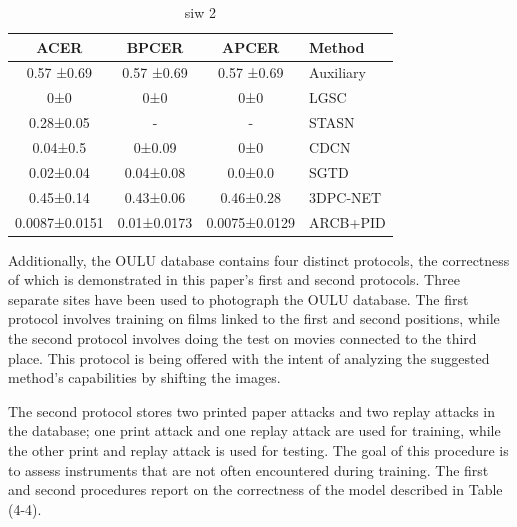 \documentclass[journal]{IEEEtran}
\begin{document}
\begin{table}[!h]
	\caption{siw 2 }
	\label{tab:siw2}
	\centering
	\begin{tabular}{|c|c|c|l|}
	\hline ACER      & BPCER   & APCER     & Method              \\
	\hline 0.57 ±0.69& 0.57 ±0.69  & 0.57 ±0.69& \cite{liu2018learning} Auxiliary \\
	\hline 0±0       & 0±0     & 0±0       & \cite{feng2020learning} LGSC       \\
	\hline 0.28±0.05 & -           & -             & \cite{yang2019face} STASN       \\
	\hline 0.04±0.5  & 0±0.09  & 0±0       & \cite{yu2020searching} CDCN        \\
	\hline 0.02±0.04 & 0.04±0.08   & 0.0±0.0   & \cite{wang2020deep} SGTD    \\
	\hline 0.45±0.14 & 0.43±0.06   & 0.46±0.28 & \cite{li20203dpc}   3DPC-NET   \\
	\hline 0.0087±0.0151 & 0.01±0.0173 & 0.0075±0.0129 & ARCB+PID            \\
	\hline         
\end{tabular}
\end{table}

Additionally, the OULU database contains four distinct protocols, the correctness of which is demonstrated in this paper's first and second protocols.
Three separate sites have been used to photograph the OULU database. The first protocol involves training on films linked to the first and second positions, while the second protocol involves doing the test on movies connected to the third place. This protocol is being offered with the intent of analyzing the suggested method's capabilities by shifting the images.

The second protocol stores two printed paper attacks and two replay attacks in the database; one print attack and one replay attack are used for training, while the other print and replay attack is used for testing. The goal of this procedure is to assess instruments that are not often encountered during training. The first and second procedures report on the correctness of the model described in Table (4-4).
\end{document}
